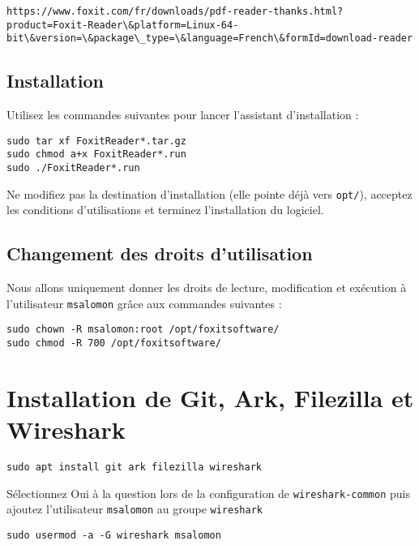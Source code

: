 \begin{lstlisting}
https://www.foxit.com/fr/downloads/pdf-reader-thanks.html?product=Foxit-Reader\&platform=Linux-64-bit\&version=\&package\_type=\&language=French\&formId=download-reader
\end{lstlisting}

\subsection{Installation}

Utilisez les commandes suivantes pour lancer l'assistant d'installation :

\begin{lstlisting}
sudo tar xf FoxitReader*.tar.gz
sudo chmod a+x FoxitReader*.run
sudo ./FoxitReader*.run
\end{lstlisting}

Ne modifiez pas la destination d'installation (elle pointe déjà vers \texttt{opt/}), acceptez les conditions d'utilisations et terminez l'installation du logiciel.

\subsection{Changement des droits d'utilisation}

Nous allons uniquement donner les droits de lecture, modification et exécution à l'utilisateur \texttt{msalomon} grâce aux commandes suivantes :

\begin{lstlisting}
sudo chown -R msalomon:root /opt/foxitsoftware/
sudo chmod -R 700 /opt/foxitsoftware/
\end{lstlisting}

\section{Installation de Git, Ark, Filezilla et Wireshark}

\begin{lstlisting}
sudo apt install git ark filezilla wireshark
\end{lstlisting}

Sélectionnez Oui à la question lors de la configuration de \texttt{wireshark-common} puis ajoutez l'utilisateur \texttt{msalomon} au groupe \texttt{wireshark}

\begin{lstlisting}
sudo usermod -a -G wireshark msalomon
\end{lstlisting}

